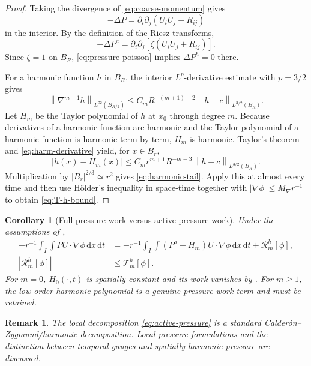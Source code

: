 \documentclass[10pt,a4paper]{amsart}
\numberwithin{equation}{section}
\newtheorem{corollary}[theorem]{Corollary}
\newtheorem{remark}[theorem]{Remark}
\newcommand{\dxdt}{\,\mathrm dx\,\mathrm dt}
\newcommand{\norm}[2]{\left\lVert #1\right\rVert_{#2}}
\begin{document}
\begin{proof}
Taking the divergence of \eqref{eq:coarse-momentum} gives
\begin{equation}\label{eq:pressure-poisson}
-\Delta P
=
\partial_i\partial_j(U_iU_j+R_{ij})
\end{equation}
in the interior. By the definition of the Riesz transforms,
\[
-\Delta P^a
=
\partial_i\partial_j
\left[
\zeta(U_iU_j+R_{ij})
\right].
\]
Since \(\zeta=1\) on \(B_R\), \eqref{eq:pressure-poisson} implies \(\Delta P^h=0\) there.

For a harmonic function \(h\) in \(B_R\), the interior \(L^p\)-derivative estimate with \(p=3/2\) gives
\begin{equation}\label{eq:harm-derivative}
\norm{\nabla^{m+1}h}{L^\infty(B_{R/2})}
\le
C_m R^{-(m+1)-2}
\norm{h-c}{L^{3/2}(B_R)}.
\end{equation}
Let \(H_m\) be the Taylor polynomial of \(h\) at \(x_0\) through degree \(m\). Because derivatives of a harmonic function are harmonic and the Taylor polynomial of a harmonic function is harmonic term by term, \(H_m\) is harmonic. Taylor's theorem and \eqref{eq:harm-derivative} yield, for \(x\in B_r\),
\[
|h(x)-H_m(x)|
\le
C_m r^{m+1}R^{-m-3}
\norm{h-c}{L^{3/2}(B_R)}.
\]
Multiplication by \(|B_r|^{2/3}\simeq r^2\) gives \eqref{eq:harmonic-tail}. Apply this at almost every time and then use H\"older's inequality in space-time together with \(|\nabla\phi|\le M_\nabla r^{-1}\) to obtain \eqref{eq:T-h-bound}.
\end{proof}

\begin{corollary}[Full pressure work versus active pressure work]\label{cor:pressure-split}
Under the assumptions of ,
\begin{align}
-r^{-1}\int_I\int PU\cdot\nabla\phi\dxdt
&=
-r^{-1}\int_I\int(P^a+H_m)U\cdot\nabla\phi\dxdt
+
\mathcal R_m^h[\phi],
\label{eq:pressure-work-split}
\\
|\mathcal R_m^h[\phi]|
&\le\mathcal T_m^h[\phi].
\label{eq:pressure-work-residual}
\end{align}
For \(m=0\), \(H_0(\cdot,t)\) is spatially constant and its work vanishes by . For \(m\ge1\), the low-order harmonic polynomial is a genuine pressure-work term and must be retained.
\end{corollary}

\begin{remark}
The local decomposition \eqref{eq:active-pressure} is a standard Calder\'on--Zygmund/harmonic decomposition. Local pressure formulations and the distinction between temporal gauges and spatially harmonic pressure are discussed.
\end{remark}
\end{document}
